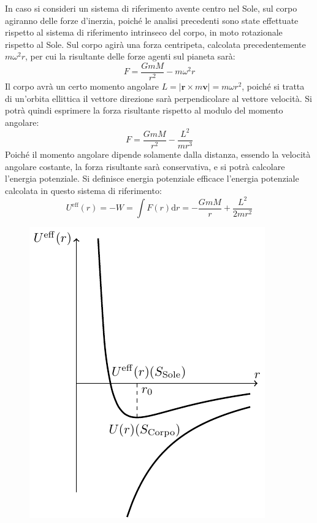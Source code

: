 \documentclass{article}
\newcommand{\vect}[1]{\boldsymbol{\mathbf{#1}}}
\newcommand{\df}{\mathrm{d}}
\numberwithin{equation}{subsection}
\begin{document}
In caso si consideri un sistema di riferimento avente centro nel Sole, sul corpo agiranno delle forze d'inerzia, poiché le analisi 
precedenti sono state effettuate rispetto al sistema di riferimento intrinseco del corpo, in moto rotazionale rispetto al Sole. Sul corpo agirà una forza centripeta, calcolata 
precedentemente $m\omega^2r$, per cui la risultante delle forze agenti sul pianeta sarà:
\begin{equation*}
    F=\displaystyle\frac{GmM}{r^2}-m\omega^2r
\end{equation*}
Il corpo avrà un certo momento angolare $L=|\vect{r}\times m\vect{v}|=m\omega r^2$, poiché si tratta di un'orbita ellittica il vettore direzione 
sarà perpendicolare al vettore velocità. Si potrà quindi esprimere la forza risultante rispetto al modulo del momento angolare:
\begin{equation*}
    F=\displaystyle\frac{GmM}{r^2}-\frac{L^2}{mr^3}
\end{equation*}
Poiché il momento angolare dipende solamente dalla distanza, essendo la velocità angolare costante, la forza risultante sarà conservativa, e si potrà 
calcolare l'energia potenziale. Si definisce energia potenziale efficace l'energia potenziale calcolata in questo sistema di riferimento:
\begin{equation}
    U^\mathrm{eff}(r)=-W=\displaystyle\int F(r)\df r=-\displaystyle\frac{GmM}{r}+\frac{L^2}{2mr^2}
\end{equation}

\begin{figure}[H]%
    \centering
    \includegraphics{potenziale-efficace.pdf}%
\end{figure}
\end{document}
